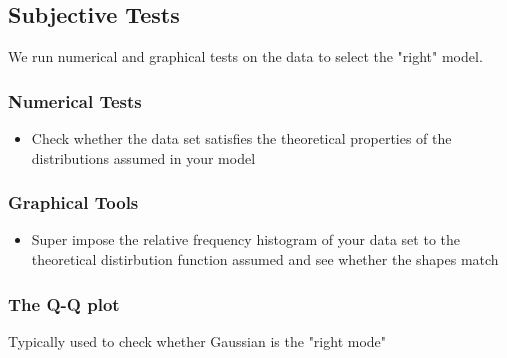 \documentclass{article}
\begin{document}
\subsection*{Subjective Tests}
We run numerical and graphical tests on the data to select the "right" model.
\subsubsection*{Numerical Tests}
\begin{itemize}
\item Check whether the data set satisfies the theoretical properties of the distributions assumed in your model  
\end{itemize}
\subsubsection{Graphical Tools}
\begin{itemize}
\item Super impose the relative frequency histogram of your data set to the theoretical distirbution function assumed and see whether the shapes match 
\end{itemize}

\subsubsection*{The Q-Q plot} 
Typically used to check whether Gaussian is the "right mode"
\end{document}
